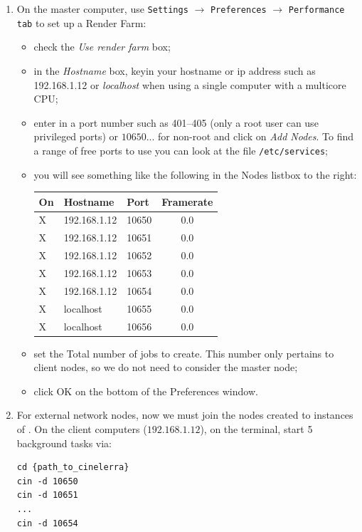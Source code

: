 \begin{enumerate}
\item On the master computer, use \texttt{Settings} $\rightarrow$
  \texttt{Preferences} $\rightarrow$ \texttt{Performance} \texttt{tab}
  to set up a Render Farm:
  \begin{itemize}
  \item check the \textit{Use render farm} box;
  \item in the \textit{Hostname} box, keyin your hostname or ip
    address such as 192.168.1.12 or \textit{localhost} when using a single computer with a multicore CPU;
  \item enter in a port number such as 401--405 (only a root user
    can use privileged ports) or $10650...$ for non-root and click on \textit{Add Nodes}. To find a range of free ports to use you can look at the file \texttt{/etc/services};
  \item you will see something like the following in the Nodes
    listbox to the right:\newline
    \begin{tabular}{lllc}
    	\hline
    	On & Hostname & Port & Framerate\\
        \hline
        X & 192.168.1.12 & 10650 & 0.0 \\
        X & 192.168.1.12 & 10651 & 0.0 \\
        X & 192.168.1.12 & 10652 & 0.0 \\
        X & 192.168.1.12 & 10653 & 0.0 \\
        X & 192.168.1.12 & 10654 & 0.0 \\
        X & localhost & 10655 & 0.0 \\
        X & localhost & 10656 & 0.0 \\
        \hline
    \end{tabular}
  \item set the Total number of jobs to create. This number only pertains to client nodes, so we do not need to consider the master node;
  \item click OK on the bottom of the Preferences window.
  \end{itemize}
\item For external network nodes, now we must join the nodes created to instances of \CGG{}. On the client computers ($192.168.1.12$), on the terminal, start 5 background  \CGG{} tasks via:
\begin{lstlisting}[style=sh]
cd {path_to_cinelerra}
cin -d 10650 
cin -d 10651
...
cin -d 10654
\end{lstlisting}

\end{enumerate}
